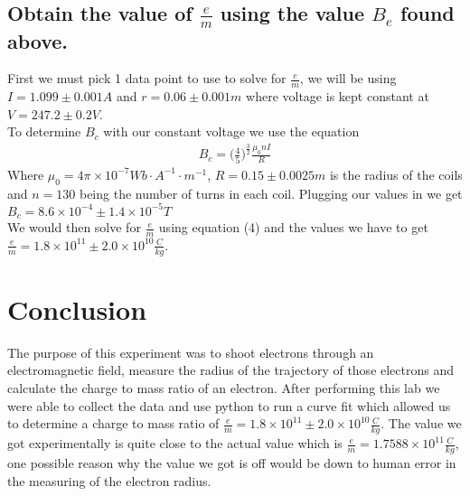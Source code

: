 \documentclass{article}
\begin{document}
\subsection*{Obtain the value of $\frac{e}{m}$ using the value $B_e$ found above.}
First we must pick 1 data point to use to solve for $\frac{e}{m}$, we will be
using \\$I = 1.099 \pm 0.001 A$ and $r = 0.06 \pm 0.001 m$ where voltage is kept
constant at \\$V = 247.2 \pm 0.2V$.\\
To determine $B_c$ with our constant voltage we use the equation
\begin{align*}
    B_c = \bigg(\frac{4}{5}\bigg)^{\frac{3}{2}}\frac{\mu_0nI}{R}
\end{align*}
Where $\mu_0 = 4\pi\times10^{-7}Wb\cdot A^{-1}\cdot m^{-1}$, $R = 0.15 \pm 0.0025m$
is the radius of the coils and $n = 130$ being the number of turns in each coil.
Plugging our values in we get $B_c = 8.6\times10^{-4} \pm 1.4\times10^{-5}T$\\
We would then solve for $\frac{e}{m}$ using equation (4) and the values we have
to get $\frac{e}{m} = 1.8\times 10^{11} \pm 2.0\times10^{10}\frac{C}{kg}$.
\section{Conclusion}
The purpose of this experiment was to shoot electrons through an electromagnetic
field, measure the radius of the trajectory of those electrons and calculate the
charge to mass ratio of an electron. After performing this lab we were able to
collect the data and use python to run a curve fit which allowed us to determine
a charge to mass ratio of $\frac{e}{m} = 1.8\times 10^{11} \pm 2.0\times10^{10}\frac{C}{kg}$.
The value we got experimentally is quite close to the actual value which is
$\frac{e}{m} = 1.7588\times10^{11}\frac{C}{kg}$, one possible reason why the value
we got is off would be down to human error in the measuring of the electron radius.
\end{document}
